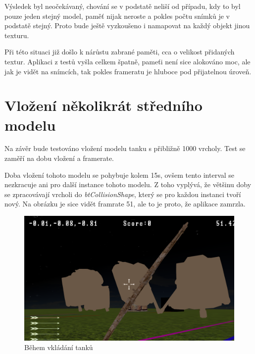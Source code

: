 Výsledek byl neočekávaný, chování se v podstatě neliší od případu, kdy to byl pouze jeden stejný model, paměť nijak neroste a pokles počtu snímků je v podstatě stejný. Proto bude ještě vyzkoušeno i namapovat na každý objekt jinou texturu.

Při této situaci již došlo k nárůstu zabrané paměti, cca o velikost přidaných textur. Aplikaci z testů vyšla celkem špatně, pameťi není sice alokováno moc, ale jak je vidět na snímcích, tak pokles frameratu je hluboce pod přijatelnou úroveň.
\section{Vložení několikrát středního modelu}
Na závěr bude testováno vložení modelu tanku s přibližně 1000 vrcholy. Test se zaměří na dobu vložení a framerate.  

Doba vložení tohoto modelu se pohybuje kolem 15s, ovšem tento interval se nezkracuje ani pro další instance tohoto modelu. Z toho vyplývá, že většinu doby se zpracovávají vrcholi do \emph{btCollisionShape}, který se pro každou instanci tvoří nový. Na obrázku je sice vidět framrate 51, ale to je proto, že aplikace zamrzla.
\begin{figure}[!tbp]
	\centering
	\begin{minipage}[b]{0.4\textwidth}
		\includegraphics[width=\textwidth]{obrazky-figures/21}
		\caption{Během vkládání tanků}
	\end{minipage}
	\hfill
	\begin{minipage}[b]{0.4\textwidth}

	\end{minipage}
\end{figure}
